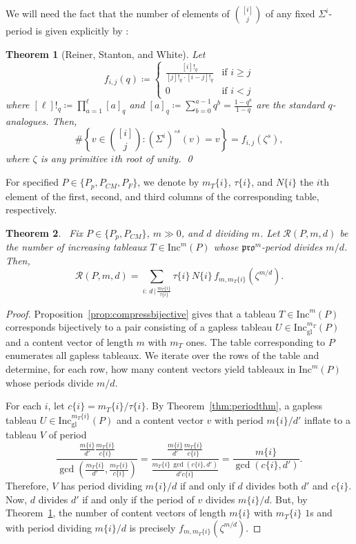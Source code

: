\documentclass[12pt]{amsart}
\newtheorem{theorem}{Theorem}[section]
\theoremstyle{definition}
\theoremstyle{remark}
\numberwithin{equation}{section}
\newcommand{\inc}{\ensuremath{\mathrm{Inc}}}
\newcommand{\incgl}{\inc_{\mathrm{gl}}}
\newcommand{\pro}{\mathfrak{pro}}
\begin{document}
We will need the fact that the number of elements of $\binom{[i]}{j}$ of any fixed $\Sigma^i$-period is given explicitly by \cite[Theorem~1.1(b)]{Reiner.Stanton.White}:
\begin{theorem}[Reiner, Stanton, and White]\label{thm:rsw}
Let 
\begin{equation*}
f_{i,j}(q) \coloneqq 
\begin{cases}
 \frac{[i]!_q}{[j]!_q\cdot [i-j]!_q} & \text{if } i \geq j \\
 0 & \text{if } i < j 
\end{cases}
\end{equation*}
where $[\ell]!_q \coloneqq \prod_{a=1}^\ell [a]_q$ and $[a]_q \coloneqq \sum_{b = 0}^{a-1} q^b = \frac{1-q^{a}}{1-q}$ are the standard $q$-analogues. Then, 
\[\#\left\{ v \in \binom{[i]}{j} : (\Sigma^i)^{\circ s}(v) = v \right\} = f_{i,j}(\zeta^s),\] where $\zeta$ is any primitive $i$th root of unity. \qed
\end{theorem} 

For specified $P \in \{P_p, P_{CM}, P_F\}$, we denote by $m_T\{i\}$, $\tau\{i\}$, and $N\{i\}$ the $i$th element of the first, second, and third columns of the corresponding table, respectively. 

\begin{theorem}~\label{thm:mainresult}
Fix $P \in \lbrace  P_p, P_{CM} \rbrace$, $m \gg 0$, and $d$ dividing $m$. Let $\mathcal{R}(P,m,d)$ be the number of increasing tableaux $T \in \inc^m(P)$ whose $\pro^m$-period divides $m/d$. Then,
\begin{equation}\label{eq:mainresulteq} 
\mathcal{R}(P,m,d)  = \sum \limits_{i: \, d \, \vert \, \frac{m_T\{i\}}{\tau\{i\}}} \tau\{i\} \, N\{i\} \, f_{m,m_T\{i\}}(\zeta^{m/d}).
\end{equation}
\end{theorem}
\begin{proof}
Proposition~\ref{prop:compressbijective} gives that a tableau $T \in \inc^m(P)$ corresponds bijectively to a pair consisting of a gapless tableau $U \in \incgl^{m_T}(P)$ and a content vector of length $m$ with $m_T$ ones. The table corresponding to $P$ enumerates all gapless tableaux. We iterate over the rows of the table and determine, for each row, how many content vectors yield tableaux in $\inc^m(P)$ whose periods divide $m/d$. 

For each $i$, let $c\{i\} = m_T\{i\}/\tau\{i\}$. By Theorem~\ref{thm:periodthm}, a gapless tableau $U \in \incgl^{m_T\{i\}}(P)$ and a content vector $v$ with period $m\{i\}/d'$ inflate to a tableau $V$ of period \[ \frac{\frac{m\{i\}}{d'} \frac{m_T\{i\}}{c\{i\}}}{\gcd(\frac{m_T\{i\}}{d'},\frac{m_T\{i\}}{c\{i\}})} = \frac{\frac{m\{i\}}{d'} \frac{m_T\{i\}}{c\{i\}}}{\frac{m_T\{i\} \, \gcd(c\{i\},d')}{d' c\{i\}}} = \frac{m\{i\}}{\gcd(c\{i\},d')}. \] 
Therefore, $V$ has period dividing $m\{i\}/d$ if and only if $d$ divides both $d'$ and $c\{i\}$. Now, $d$ divides $d'$ if and only if the period of $v$ divides $m\{i\}/d$. But, by Theorem~\ref{thm:rsw}, the number of content vectors of length $m\{i\}$ with $m_T\{i\}$ $1$s and with period dividing $m\{i\}/d$ is precisely $f_{m,m_T\{i\}}(\zeta^{m/d})$.
\end{proof}
\end{document}
